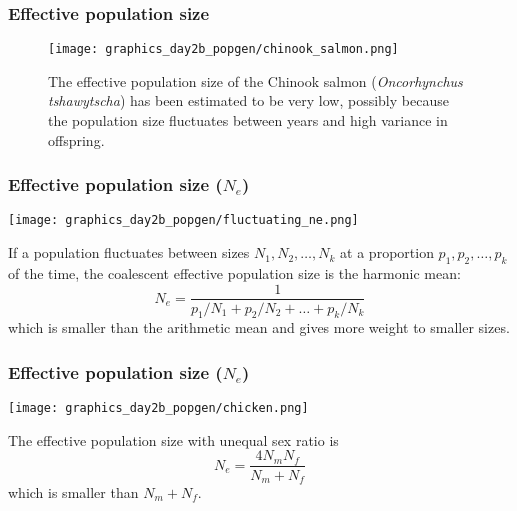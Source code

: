 \documentclass{beamer}
\newcommand{\1}{\ensuremath{\mathbf{1}}}
\begin{document}
%
%
%
\begin{frame}\frametitle{Effective population size}
	\begin{figure}
	\begin{center}
		\texttt{[image: graphics\_day2b\_popgen/chinook\_salmon.png]}
	\end{center}
	\caption{The effective population size of the Chinook salmon (\emph{Oncorhynchus tshawytscha}) has been estimated to be very low, possibly because the population size fluctuates between years and high variance in offspring.}
	\end{figure}
\end{frame}
%
%
%
\begin{frame}\frametitle{Effective population size ($N_e$)}
	\begin{center}
		\texttt{[image: graphics\_day2b\_popgen/fluctuating\_ne.png]}
	\end{center}
	If a population fluctuates between sizes $N_1, N_2, \ldots, N_k$ at a proportion $p_1, p_2, \ldots, p_k$ of the time, the coalescent effective population size is the harmonic mean:
	\begin{equation}
		N_e = \frac{1}{p_1/N_1 + p_2/N_2 + \ldots + p_k/N_k}
	\end{equation}
	which is smaller than the arithmetic mean and gives more weight to smaller sizes.
\end{frame}
%
%
%
\begin{frame}\frametitle{Effective population size ($N_e$)}
	\begin{center}
		\texttt{[image: graphics\_day2b\_popgen/chicken.png]}
	\end{center}
	The effective population size with unequal sex ratio is
	\begin{equation}
		N_e = \frac{4N_m N_f}{N_m + N_f}
	\end{equation}
	which is smaller than $N_m + N_f$.
\end{frame}
\end{document}
